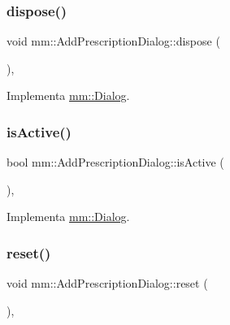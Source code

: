 \subsubsection{\texorpdfstring{dispose()}{dispose()}}
{\footnotesize\ttfamily void mm\+::\+Add\+Prescription\+Dialog\+::dispose (\begin{DoxyParamCaption}{ }\end{DoxyParamCaption})\hspace{0.3cm}{\ttfamily [override]}, {\ttfamily [virtual]}}



Implementa \mbox{\hyperlink{classmm_1_1_dialog_a3f2e361836af48ee3808f4dd6e4f8e48}{mm\+::\+Dialog}}.

\mbox{\label{classmm_1_1_add_prescription_dialog_a4ff93500e8fd90512dc4575147b2c910}} 
\subsubsection{\texorpdfstring{is\+Active()}{isActive()}}
{\footnotesize\ttfamily bool mm\+::\+Add\+Prescription\+Dialog\+::is\+Active (\begin{DoxyParamCaption}{ }\end{DoxyParamCaption})\hspace{0.3cm}{\ttfamily [override]}, {\ttfamily [virtual]}}



Implementa \mbox{\hyperlink{classmm_1_1_dialog_a22abaf4e90b6fdca5c20039f6b9e15ac}{mm\+::\+Dialog}}.

\mbox{\label{classmm_1_1_add_prescription_dialog_a6ace04587432a197436bb04c7b68d60d}} 
\subsubsection{\texorpdfstring{reset()}{reset()}}
{\footnotesize\ttfamily void mm\+::\+Add\+Prescription\+Dialog\+::reset (\begin{DoxyParamCaption}{ }\end{DoxyParamCaption})\hspace{0.3cm}{\ttfamily [override]}, {\ttfamily [virtual]}}



